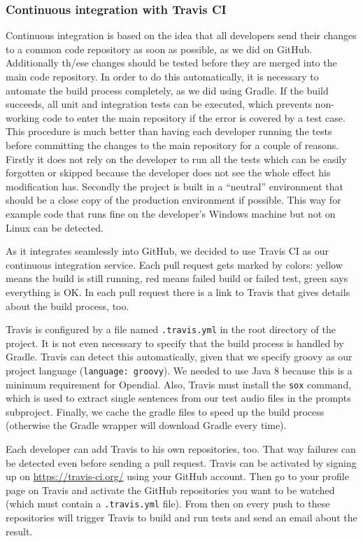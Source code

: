 \documentclass[a4paper, 12pt]{article}
\begin{document}
\subsubsection*{Continuous integration with Travis CI}

Continuous integration is based on the idea that all developers send their changes to a common code repository as soon as possible, as we did on GitHub. 
Additionally th/ese changes should be tested before they are merged into the main code repository. 
In order to do this automatically, it is necessary to automate the build process completely, as we did using Gradle.
If the build succeeds, all unit and integration tests can be executed, which prevents non-working code to enter the main repository if the error is covered by a test case.
This procedure is much better than having each developer running the tests before committing the changes to the main repository for a couple of reasons.
Firstly it does not rely on the developer to run all the tests which can be easily forgotten or skipped because the developer does not see the whole effect his modification has.
Secondly the project is built in a “neutral” environment that should be a close copy of the production environment if possible. 
This way for example code that runs fine on the developer's Windows machine but not on Linux can be detected.

As it integrates seamlessly into GitHub, we decided to use Travis CI as our continuous integration service. Each pull request gets marked by colors: yellow means the build is still running, red means failed build or failed test, green says everything is OK. In each pull request there is a link to Travis that gives details about the build process, too.

Travis is configured by a file named \texttt{.travis.yml} in the root directory of the project. 
It is not even necessary to specify that the build process is handled by Gradle.
Travis can detect this automatically, given that we specify groovy as our project language (\texttt{language: groovy}).
We needed to use Java 8 because this is a minimum requirement for Opendial.
Also, Travis must install the \texttt{sox} command, which is used to extract single sentences from our test audio files in the prompts subproject.
Finally, we cache the gradle files to speed up the build process (otherwise the Gradle wrapper will download Gradle every time).

Each developer can add Travis to his own repositories, too.
That way failures can be detected even before sending a pull request.
Travis can be activated by signing up on \url{https://travis-ci.org/} using your GitHub account.
Then go to your profile page on Travis and activate the GitHub repositories you want to be watched (which must contain a \texttt{.travis.yml} file).
From then on every push to these repositories will trigger Travis to build and run tests and send an email about the result.
\end{document}
